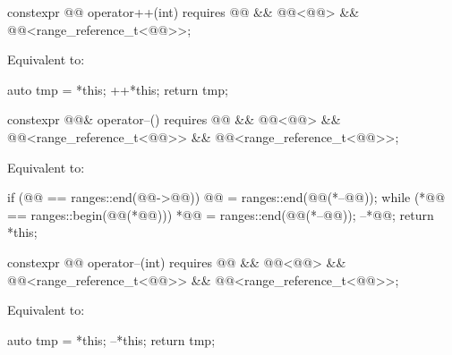 %
\begin{itemdecl}
constexpr @@ operator++(int)
  requires @@ && @@<@@> &&
           @@<range_reference_t<@@>>;
\end{itemdecl}

\begin{itemdescr}
\pnum
\effects
Equivalent to:
\begin{codeblock}
auto tmp = *this;
++*this;
return tmp;
\end{codeblock}
\end{itemdescr}

%
\begin{itemdecl}
constexpr @@& operator--()
  requires @@ && @@<@@> &&
           @@<range_reference_t<@@>> &&
           @@<range_reference_t<@@>>;
\end{itemdecl}

\begin{itemdescr}
\pnum
\effects
Equivalent to:
\begin{codeblock}
if (@@ == ranges::end(@@->@@))
  @@ = ranges::end(@@(*--@@));
while (*@@ == ranges::begin(@@(*@@)))
  *@@ = ranges::end(@@(*--@@));
--*@@;
return *this;
\end{codeblock}
\end{itemdescr}

%
\begin{itemdecl}
constexpr @@ operator--(int)
  requires @@ && @@<@@> &&
           @@<range_reference_t<@@>> &&
           @@<range_reference_t<@@>>;
\end{itemdecl}

\begin{itemdescr}
\pnum
\effects
Equivalent to:
\begin{codeblock}
auto tmp = *this;
--*this;
return tmp;
\end{codeblock}
\end{itemdescr}

